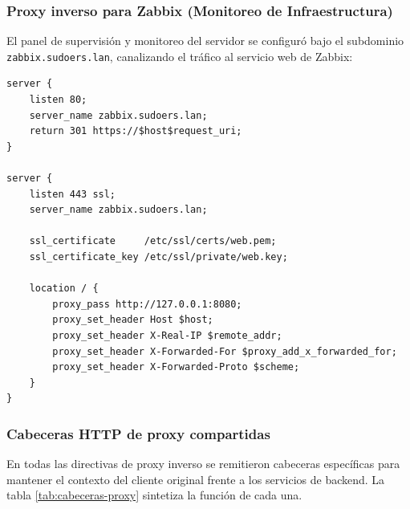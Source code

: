 \subsubsection{Proxy inverso para Zabbix (Monitoreo de Infraestructura)}

El panel de supervisión y monitoreo del servidor se configuró bajo el subdominio
\texttt{zabbix.sudoers.lan}, canalizando el tráfico al servicio web de Zabbix:

\begin{lstlisting}[style=terminal]
server {
    listen 80;
    server_name zabbix.sudoers.lan;
    return 301 https://$host$request_uri;
}

server {
    listen 443 ssl;
    server_name zabbix.sudoers.lan;

    ssl_certificate     /etc/ssl/certs/web.pem;
    ssl_certificate_key /etc/ssl/private/web.key;

    location / {
        proxy_pass http://127.0.0.1:8080;
        proxy_set_header Host $host;
        proxy_set_header X-Real-IP $remote_addr;
        proxy_set_header X-Forwarded-For $proxy_add_x_forwarded_for;
        proxy_set_header X-Forwarded-Proto $scheme;
    }
}
\end{lstlisting}

\subsubsection{Cabeceras HTTP de proxy compartidas}

En todas las directivas de proxy inverso se remitieron cabeceras específicas
para mantener el contexto del cliente original frente a los servicios de
backend. La tabla \ref{tab:cabeceras-proxy} sintetiza la función de cada una.

\begin{table}[H]
\centering
\caption{Cabeceras HTTP de los proxies inversos}
\label{tab:cabeceras-proxy}
\end{table}

